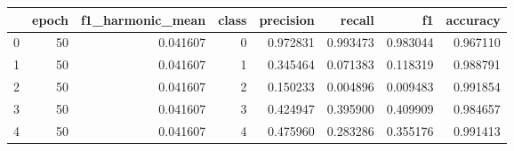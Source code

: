 \begin{tabular}{lrrrrrrr}
\toprule
 & epoch & f1_harmonic_mean & class & precision & recall & f1 & accuracy \\
\midrule
0 & 50 & 0.041607 & 0 & 0.972831 & 0.993473 & 0.983044 & 0.967110 \\
1 & 50 & 0.041607 & 1 & 0.345464 & 0.071383 & 0.118319 & 0.988791 \\
2 & 50 & 0.041607 & 2 & 0.150233 & 0.004896 & 0.009483 & 0.991854 \\
3 & 50 & 0.041607 & 3 & 0.424947 & 0.395900 & 0.409909 & 0.984657 \\
4 & 50 & 0.041607 & 4 & 0.475960 & 0.283286 & 0.355176 & 0.991413 \\
\bottomrule
\end{tabular}

